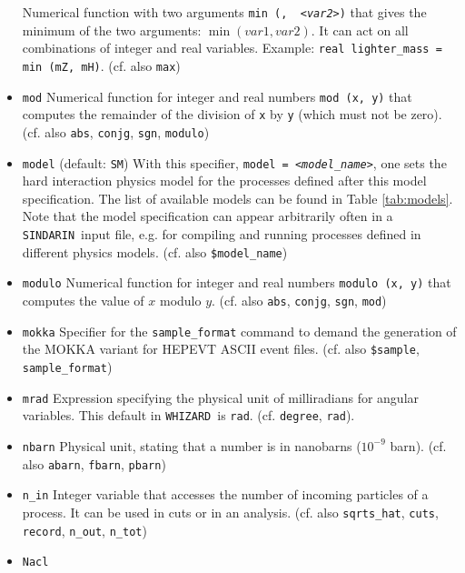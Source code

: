 \documentclass[12pt]{book}
\newcommand{\ttt}[1]{\texttt{#1}}
\newcommand{\whizard}{\ttt{WHIZARD}}
\newcommand{\sindarin}{\ttt{SINDARIN}}
\begin{document}
\begin{itemize}
Numerical function with two arguments \ttt{min ({\em <var1>}, {\em
<var2>})} that gives the minimum of the two arguments: $\min (var1,
var2)$. It can act on all combinations of integer and real
variables. Example: \ttt{real lighter\_mass = min (mZ, mH)}. (cf. also
\ttt{max})
\item
\ttt{mod} \newline
Numerical function for integer and real numbers \ttt{mod (x, y)} that
computes the remainder of the division of \ttt{x} by \ttt{y} (which
must not be zero). (cf. also
\ttt{abs}, \ttt{conjg}, \ttt{sgn}, \ttt{modulo})
\item
\ttt{model} \qquad (default: \ttt{SM}) \newline
With this specifier, \ttt{model = {\em <model\_name>}}, one sets the hard
interaction physics model for the processes defined after this model
specification. The list of available models can be found in Table
\ref{tab:models}. Note that the model specification can appear
arbitrarily often in a \sindarin\ input file, e.g. for compiling and
running processes defined in different physics models. (cf. also
\ttt{\$model\_name})
\item
\ttt{modulo} \newline
Numerical function for integer and real numbers \ttt{modulo (x, y)} that
computes the value of $x$ modulo $y$. (cf. also
\ttt{abs}, \ttt{conjg}, \ttt{sgn}, \ttt{mod})
\item
\ttt{mokka} \newline
Specifier for the \ttt{sample\_format} command to demand the
generation of the MOKKA variant for HEPEVT ASCII event
files. (cf. also \ttt{\$sample},
\ttt{sample\_format})
\item
\ttt{mrad} \newline
Expression specifying the physical unit of milliradians for angular
variables. This default in \whizard\ is \ttt{rad}. (cf. \ttt{degree}, \ttt{rad}).
\item
\ttt{nbarn} \newline
Physical unit, stating that a number is in nanobarns ($10^{-9}$
barn). (cf. also \ttt{abarn}, \ttt{fbarn}, \ttt{pbarn})
\item
\ttt{n\_in} \newline
Integer variable that accesses the number of incoming particles of a
process. It can be used in cuts or in an analysis. (cf. also
\ttt{sqrts\_hat}, \ttt{cuts}, \ttt{record}, \ttt{n\_out}, \ttt{n\_tot})
\item
\ttt{Nacl} \newline

\end{itemize}
\end{document}
